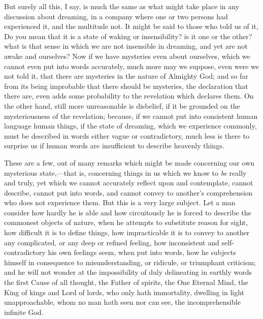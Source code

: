 But surely all this, I say, is much the same as what might take
place in any discussion about dreaming, in a company where one or two
persons had experienced it, and the multitude not. It might be said to
those who told us of it, Do you mean that it is a state of waking or
insensibility? is it one or the other? what is that sense in which we
are not insensible in dreaming, and yet are not awake and ourselves?
Now if we have mysteries even about ourselves, which we cannot even
put into words accurately, much more may we suppose, even were we not
told it, that there are mysteries in the nature of Almighty God; and
so far from its being improbable that there should be mysteries, the
declaration that there are, even adds some probability to the
revelation which declares them. On the other hand, still more
unreasonable is disbelief, if it be grounded on the mysteriousness of
the revelation; because, if we cannot put into consistent human
language human things, if the state of dreaming, which we experience
commonly, must be described in words either vague or contradictory,
much less is there to surprise us if human words are insufficient to
describe heavenly things.

These are a few, out of many remarks which might be made concerning
our own mysterious state,—that is, concerning things in us which we
know to \emph{be} really and truly, yet which we cannot accurately
reflect upon and contemplate, cannot describe, cannot put into words,
and cannot convey to another's comprehension who does not experience
them. But this is a very large subject. Let a man consider how hardly
he is able and how circuitously he is forced to describe the commonest
objects of nature, when he attempts to substitute reason for sight,
how difficult it is to define things, how impracticable it is to
convey to another any complicated, or any deep or refined feeling, how
inconsistent and self-contradictory his own feelings seem, when put
into words, how he subjects himself in consequence to
misunderstanding, or ridicule, or triumphant criticism; and he
will not wonder at the impossibility of duly delineating in earthly
words the first Cause of all thought, the Father of spirits, the One
Eternal Mind, the King of kings and Lord of lords, who only hath
immortality, dwelling in light unapproachable, whom no man hath seen
nor can see, the incomprehensible infinite God.

